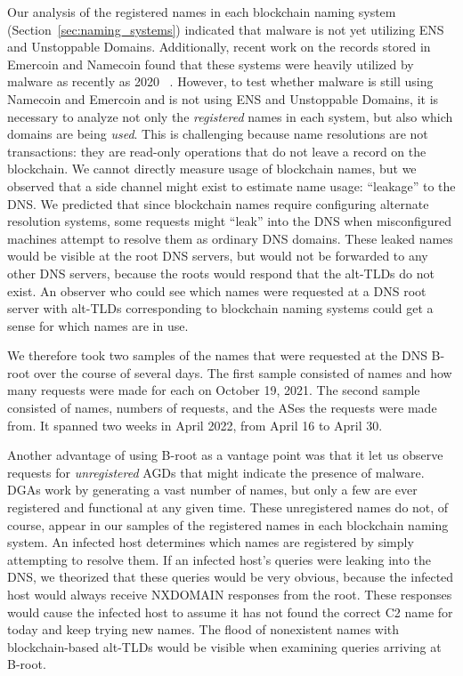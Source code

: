 Our analysis of the registered names in each blockchain naming system 
(Section~\ref{sec:naming_systems}) indicated that malware is not yet utilizing 
ENS and Unstoppable Domains. Additionally, recent work on the records stored in 
Emercoin and Namecoin found that these systems were heavily 
utilized by malware as recently as 2020 ~\cite{casino_unearthing_2021}. 
However, to test whether malware is still using Namecoin and Emercoin and is 
not using ENS and Unstoppable Domains, it is necessary to analyze not only the 
\emph{registered} names in each system, but also which domains are being 
\emph{used}. 
This is challenging because name resolutions are not 
transactions: they are read-only operations that do not leave 
a record on the blockchain. We cannot directly measure 
usage of blockchain names, but we observed that a side 
channel might exist to estimate name usage: ``leakage'' to the DNS. We 
predicted that since blockchain names require configuring alternate resolution 
systems, some requests might ``leak'' into the DNS when misconfigured machines 
attempt to resolve them as ordinary DNS domains. These leaked 
names would be visible at the root DNS servers, but would not 
be forwarded to any other DNS servers, because the roots 
would respond that the alt-TLDs do not exist. An observer who could see which 
names were requested at a DNS root server with alt-TLDs corresponding to 
blockchain naming systems could get a sense for which names are in use.

We therefore took two samples of the names that were requested at the DNS 
B-root over the course of several days. The first sample consisted 
of names and how many requests were made for each on October 19, 2021. 
The second sample consisted of names, numbers of requests, and the ASes the 
requests were made from. It spanned two weeks in April 2022, from April 16 to 
April 30. 

%
Another advantage of using B-root as a vantage point was 
that it let us observe requests for \emph{unregistered} AGDs that 
might indicate the presence of malware. DGAs work by generating a vast number 
of names, but only a few are ever registered and functional at any given time. 
These unregistered names do not, of course, appear in our samples of the 
registered names in each blockchain naming system. An infected host determines 
which names are registered by simply attempting to resolve them. If an infected 
host's queries were leaking into the DNS, we theorized that these queries would 
be very obvious, because the infected host would always receive NXDOMAIN 
responses from the root. These responses would cause the infected host to 
assume it has not 
found the correct C2 name for today and keep trying new 
names. The flood of nonexistent names with blockchain-based 
alt-TLDs would be visible when examining queries arriving at B-root. 

